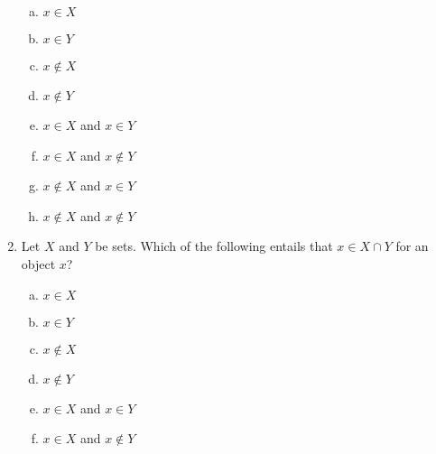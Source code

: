 \begin{enumerate}[\thesection.1]
\begin{minipage}{.5\linewidth}
\begin{enumerate}[(a)]
			\item $x\in X$
			
			\item $x\in Y$			
			
			\item $x\notin X$
			
			\item $x\notin Y$
		\end{enumerate}
		\end{minipage}
		\begin{minipage}{.5\linewidth}
		\begin{enumerate}[(a)]
		\setcounter{enumii}{4}
			
			\item $x\in X$ and $x\in Y$
		
			\item $x\in X$ and $x\notin Y$
			
			\item $x\notin X$ and $x\in Y$
			
			\item $x\notin X$ and $x\notin Y$			
					
		\end{enumerate}
		\end{minipage}
		
		\item Let $X$ and $Y$ be sets. Which of the following entails that $x\in X\cap Y$ for an object $x$?
		
		\begin{minipage}{.5\linewidth}
			\begin{enumerate}[(a)]
		
			\item $x\in X$
			
			\item $x\in Y$			
			
			\item $x\notin X$
			
			\item $x\notin Y$
		\end{enumerate}
		\end{minipage}
		\begin{minipage}{.5\linewidth}
		\begin{enumerate}[(a)]
		\setcounter{enumii}{4}
			
			\item $x\in X$ and $x\in Y$
		
			\item $x\in X$ and $x\notin Y$
			

\end{enumerate}
\end{minipage}
\end{enumerate}
